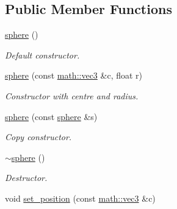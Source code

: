 \subsection*{Public Member Functions}
\begin{DoxyCompactItemize}
\item 
\mbox{\label{classphysim_1_1geometric_1_1sphere_a283a8ba30c51a04eb70dcd4cb9076ac8}} 
\hyperlink{classphysim_1_1geometric_1_1sphere_a283a8ba30c51a04eb70dcd4cb9076ac8}{sphere} ()
\begin{DoxyCompactList}\small\item\em Default constructor. \end{DoxyCompactList}\item 
\mbox{\label{classphysim_1_1geometric_1_1sphere_a172cfbef409aa9b8391c9dfe9a6a7371}} 
\hyperlink{classphysim_1_1geometric_1_1sphere_a172cfbef409aa9b8391c9dfe9a6a7371}{sphere} (const \hyperlink{structphysim_1_1math_1_1vec3}{math\+::vec3} \&c, float r)
\begin{DoxyCompactList}\small\item\em Constructor with centre and radius. \end{DoxyCompactList}\item 
\mbox{\label{classphysim_1_1geometric_1_1sphere_a12b6cce5ee95979792873496d577d121}} 
\hyperlink{classphysim_1_1geometric_1_1sphere_a12b6cce5ee95979792873496d577d121}{sphere} (const \hyperlink{classphysim_1_1geometric_1_1sphere}{sphere} \&s)
\begin{DoxyCompactList}\small\item\em Copy constructor. \end{DoxyCompactList}\item 
\mbox{\label{classphysim_1_1geometric_1_1sphere_a15734d753b465bbb4c854ed45df56fb1}} 
\hyperlink{classphysim_1_1geometric_1_1sphere_a15734d753b465bbb4c854ed45df56fb1}{$\sim$sphere} ()
\begin{DoxyCompactList}\small\item\em Destructor. \end{DoxyCompactList}\item 
void \hyperlink{classphysim_1_1geometric_1_1sphere_ad31c556961c46dbbdf3ade9bd7035d58}{set\+\_\+position} (const \hyperlink{structphysim_1_1math_1_1vec3}{math\+::vec3} \&c)

\end{DoxyCompactItemize}
